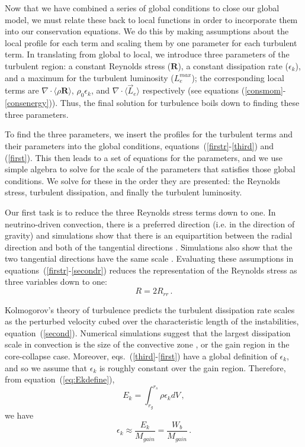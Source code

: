 \documentclass[twocolumn]{aastex6}
\begin{document}
Now that we have combined a series of global conditions to close our global model, we must relate these back to local functions in order to incorporate them into our conservation equations. We do this by making assumptions about the local profile for each term and scaling them by one parameter for each turbulent term. In translating from global to local, we introduce three parameters of the turbulent region: a constant Reynolds stress ($\textbf{R}$), a constant dissipation rate ($\epsilon_k$), and a maximum for the turbulent luminosity ($L_e^{max}$); the corresponding local terms are $\nabla \cdot \langle \rho \textbf{R} \rangle$, $\rho_0 \epsilon_k$, and $\nabla \cdot \langle \vec{L}_e \rangle$ respectively (see equations (\ref{consmom}-\ref{consenergy})). Thus, the final solution for turbulence boils down to finding these three parameters.

To find the three parameters, we insert the profiles for the turbulent
terms and their parameters into the global conditions,
equations~(\ref{firstr}-\ref{third}) and (\ref{first}). This then leads to
a set of equations for the parameters, and we use simple
algebra to solve for the scale of the parameters that satisfies those
global conditions. We solve for these in the order they are presented: the Reynolds stress, turbulent dissipation, and finally the turbulent luminosity. 

Our first task is to reduce the three Reynolds stress terms
  down to one. In neutrino-driven convection, there is a preferred direction (i.e. in
the direction of gravity) and simulations show that there is an
equipartition between the radial direction and both of the tangential
directions \citep{murphy13}. Simulations also show that the two
tangential directions have the same scale \citep{murphy13}. Evaluating
these assumptions in equations~(\ref{firstr}-\ref{secondr}) reduces the representation of the Reynolds stress as three variables down to one:
\begin{equation}
  R = 2R_{rr} \, .
\end{equation} 

Kolmogorov's theory of turbulence predicts the turbulent dissipation rate scales as the
perturbed velocity cubed over the characteristic length of the
instabilities, equation~(\ref{second}). Numerical simulations suggest
  that the largest dissipation scale in convection is the size of
  the convective zone \citep{couch14,fogl15,fern15}, or the gain region in the core-collapse case. Moreover, eqs.~(\ref{third}-\ref{first})
have a global definition of $\epsilon_k$, and so we assume that
$\epsilon_k$ is roughly constant over the gain region. Therefore, from equation~(\ref{eq:Ekdefine}),
\begin{equation}
\label{Ek}
  E_k = \int_{r_g}^{r_s} \rho \epsilon_k dV \, ,
\end{equation}
we have
\begin{equation}
  \epsilon_k \approx \frac{E_k}{M_{gain}} = \frac{W_b}{M_{gain}} \, .
  \label{epk}
\end{equation}
\end{document}

